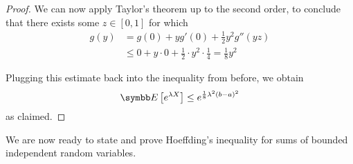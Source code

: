 \begin{proof}
We can now apply Taylor's theorem up to the second order, to conclude that there exists some \(z \in [0, 1]\) for which
\begin{align*}
    g(y) &= g(0) + y g'(0) + \frac{1}{2} y^2 g''(y z) \\[0.5em]
    &\leq 0 + y \cdot 0 + \frac{1}{2} \cdot y^2 \cdot \frac{1}{4} = \frac{1}{8} y^2
\end{align*}

Plugging this estimate back into the inequality from before, we obtain
\[
    \expectedvalue\left[e^{\lambda X}\right] \leq e^{\frac{1}{8} \lambda^2 (b - a)^2}
\]
as claimed.
\end{proof}

We are now ready to state and prove Hoeffding's inequality \cite{Hoeffding1963} for sums of bounded independent random variables.

